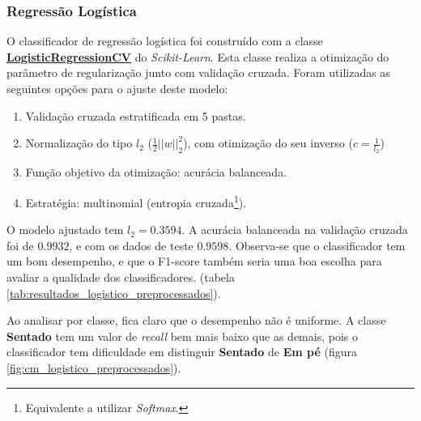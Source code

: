 \documentclass[final,5p]{elsarticle}
\numberwithin{equation}{section}
\begin{document}
    \subsubsection{Regressão Logística}

        O classificador de regressão logística foi construído com a classe \href{https://scikit-learn.org/stable/modules/generated/sklearn.linear_model.LogisticRegressionCV.html}{\textbf{LogisticRegressionCV}} do \emph{Scikit-Learn}. Esta classe realiza a otimização do parâmetro de regularização junto com validação cruzada. Foram utilizadas as seguintes opções para o ajuste deste modelo:

        \begin{enumerate}
            \item Validação cruzada estratificada em 5 pastas.
            \item Normalização do tipo $l_2$ ($\frac{1}{2} ||w||_2^2$), com otimização do seu inverso ($c = \frac{1}{l_2}$)
            \item Função objetivo da otimização: acurácia balanceada.
            \item Estratégia: multinomial (entropia cruzada\footnote{Equivalente a utilizar \emph{Softmax}.}).
        \end{enumerate}

        O modelo ajustado tem $l_2 = 0.3594$. A acurácia balanceada na validação cruzada foi de $0.9932$, e com os dados de teste $0.9598$. Observa-se que o classificador tem um bom desempenho, e que o F1-score também seria uma boa escolha para avaliar a qualidade dos classificadores. (tabela \ref{tab:resultados_logistico_preprocessados}).

        Ao analisar por classe, fica claro que o desempenho não é uniforme. A classe \textbf{Sentado} tem um valor de \emph{recall} bem mais baixo que as demais, pois o classificador tem dificuldade em distinguir \textbf{Sentado} de \textbf{Em pé} (figura \ref{fig:cm_logistico_preprocessados}).
\end{document}
